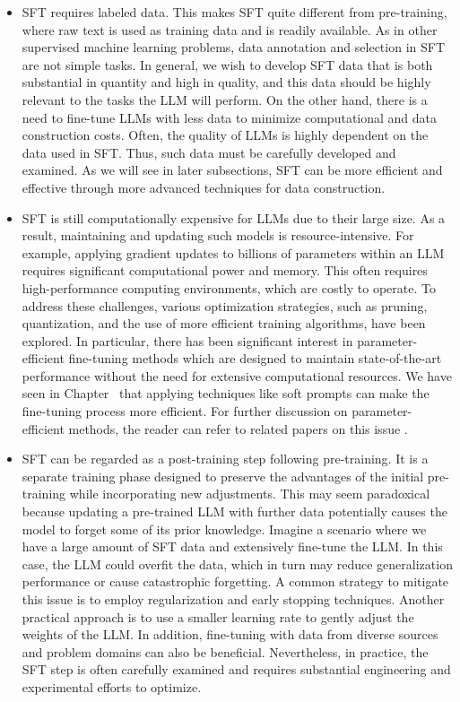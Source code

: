 \begin{itemize}
\item \vspace{0.5em} SFT requires labeled data. This makes SFT quite different from pre-training, where raw text is used as training data and is readily available. As in other supervised machine learning problems, data annotation and selection in SFT are not simple tasks. In general, we wish to develop SFT data that is both substantial in quantity and high in quality, and this data should be highly relevant to the tasks the LLM will perform. On the other hand, there is a need to fine-tune LLMs with less data to minimize computational and data construction costs. Often, the quality of LLMs is highly dependent on the data used in SFT. Thus, such data must be carefully developed and examined. As we will see in later subsections, SFT can be more efficient and effective through more advanced techniques for data construction.
\item \vspace{0.3em} SFT is still computationally expensive for LLMs due to their large size. As a result, maintaining and updating such models is resource-intensive. For example, applying gradient updates to billions of parameters within an LLM requires significant computational power and memory. This often requires high-performance computing environments, which are costly to operate. To address these challenges, various optimization strategies, such as pruning, quantization, and the use of more efficient training algorithms, have been explored. In particular, there has been significant interest in parameter-efficient fine-tuning methods which are designed to maintain state-of-the-art performance without the need for extensive computational resources. We have seen in Chapter \ChapterLLMPrompting\ that applying techniques like soft prompts can make the fine-tuning process more efficient. For further discussion on parameter-efficient methods, the reader can refer to related papers on this issue \cite{houlsby-etal:2019parameter,hu-etal:2022lora,han-etal:2024parameter}.
\item \vspace{0.3em} SFT can be regarded as a post-training step following pre-training. It is a separate training phase designed to preserve the advantages of the initial pre-training while incorporating new adjustments. This may seem paradoxical because updating a pre-trained LLM with further data potentially causes the model to forget some of its prior knowledge. Imagine a scenario where we have a large amount of SFT data and extensively fine-tune the LLM. In this case, the LLM could overfit the data, which in turn may reduce generalization performance or cause catastrophic forgetting. A common strategy to mitigate this issue is to employ regularization and early stopping techniques. Another practical approach is to use a smaller learning rate to gently adjust the weights of the LLM. In addition, fine-tuning with data from diverse sources and problem domains can also be beneficial. Nevertheless, in practice, the SFT step is often carefully examined and requires substantial engineering and experimental efforts to optimize.
\end{itemize}
